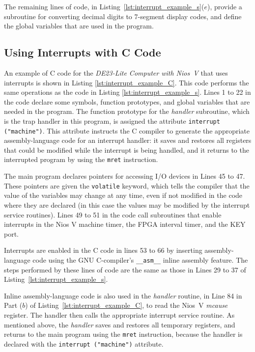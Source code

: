 \documentclass[11pt, twoside, pdftex]{article}
\newcommand{\systemNameFull}{DE23-Lite Computer with Nios~V}
\begin{document}
The remaining lines of code, in Listing~\ref{lst:interrupt_example_s}($e$),
provide a subroutine for converting decimal digits to 7-segment display codes,
and define the global variables that are used in the program.

\subsection{Using Interrupts with C Code}

An example of C code for the {\it \systemNameFull} that uses interrupts is shown in 
Listing \ref{lst:interrupt_example_C}. This code performs the same operations as
the code in Listing \ref{lst:interrupt_example_s}. Lines 1 to 22 in the code declare some symbols, 
function prototypes, and global variables that are needed in the program. The function
prototype for the {\it handler} subroutine, which is the trap handler in this program, is
assigned the attribute \texttt{interrupt ("machine")}. This attribute instructs the C compiler 
to generate the appropriate assembly-language code for an interrupt handler: it saves and 
restores all registers that could be modified while the interrupt is being handled, and it 
returns to the interrupted program by using the \texttt{mret} instruction. 

The main program declares pointers for accessing I/O devices in Lines 45 to 47. These
pointers are given the \texttt{volatile} keyword, which tells the compiler that the
value of the variables may change at any time, even if not modified in the code where
they are declared (in this case the values may be modified by the interrupt service routines). 
Lines 49 to 51 in the code call subroutines that enable interrupts in the Nios V machine
timer, the FPGA interval timer, and the KEY port. 

Interrupts are enabled in the C code in lines 53 to 66 by inserting assembly-language code 
using the GNU C-compiler's \texttt{\_\_asm\_\_} inline assembly feature. The steps performed by
these lines of code are the same as those in Lines 29 to 37 of 
Listing~\ref{lst:interrupt_example_s}.

Inline assembly-language code is also used in the {\it handler} routine, in Line 84 in 
Part ($b$) of Listing~\ref{lst:interrupt_example_C}, to read the Nios~V {\it mcause} register.
The handler then calls the appropriate interrupt service routine. As mentioned above, the
{\it handler} saves and restores all temporary registers, and returns to the main program 
using the \texttt{mret} instruction, because the
handler is declared with the \texttt{interrupt ("machine")} attribute.
\end{document}
